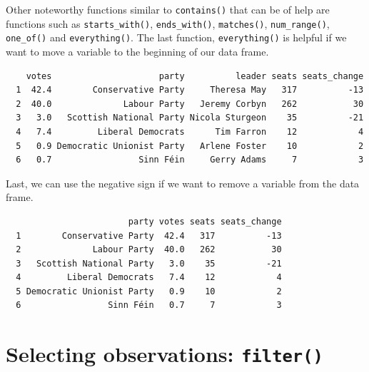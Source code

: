 \documentclass[12pt,oneside]{reedthesis}
\theoremstyle{definition}
\theoremstyle{definition}
\theoremstyle{definition}
\theoremstyle{remark}
\begin{document}
  Other noteworthy functions similar to \texttt{contains()} that can be of
  help are functions such as \texttt{starts\_with()},
  \texttt{ends\_with()}, \texttt{matches()}, \texttt{num\_range()},
  \texttt{one\_of()} and \texttt{everything()}. The last function,
  \texttt{everything()} is helpful if we want to move a variable to the
  beginning of our data frame.
  \begin{Shaded}
  \begin{Highlighting}[]
  \NormalTok{())}
  \end{Highlighting}
  \end{Shaded}
  \begin{verbatim}
    votes                     party          leader seats seats_change
  1  42.4        Conservative Party     Theresa May   317          -13
  2  40.0              Labour Party   Jeremy Corbyn   262           30
  3   3.0   Scottish National Party Nicola Sturgeon    35          -21
  4   7.4         Liberal Democrats      Tim Farron    12            4
  5   0.9 Democratic Unionist Party   Arlene Foster    10            2
  6   0.7                 Sinn Féin     Gerry Adams     7            3
  \end{verbatim}
  Last, we can use the negative sign if we want to remove a variable from
  the data frame.
  \begin{Shaded}
  \begin{Highlighting}[]
  \OperatorTok{-}
  \end{Highlighting}
  \end{Shaded}
  \begin{verbatim}
                        party votes seats seats_change
  1        Conservative Party  42.4   317          -13
  2              Labour Party  40.0   262           30
  3   Scottish National Party   3.0    35          -21
  4         Liberal Democrats   7.4    12            4
  5 Democratic Unionist Party   0.9    10            2
  6                 Sinn Féin   0.7     7            3
  \end{verbatim}
  \section{\texorpdfstring{Selecting observations:
  \texttt{filter()}}{Selecting observations: filter()}}\label{selecting-observations-filter}
  
\end{document}
